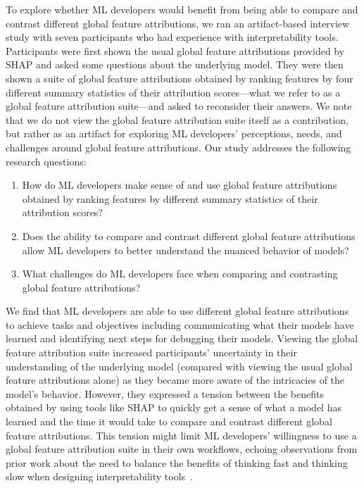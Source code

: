 \documentclass[11pt,dvipdfmx]{article}
\begin{document}
To explore whether ML developers would benefit from being able to
compare and contrast different global feature attributions, we ran an
artifact-based interview study with seven participants who had
experience with interpretability tools.  Participants were first shown
the usual global feature attributions provided by SHAP and asked some
questions about the underlying model.  They were then shown a suite of
global feature attributions obtained by ranking features by four
different summary statistics of their attribution scores---what we
refer to as a global feature attribution suite---and asked to
reconsider their answers.  We note that we do not view the global
feature attribution suite itself as a contribution, but rather as an
artifact for exploring ML developers' perceptions, needs, and
challenges around global feature attributions. Our study addresses the
following research questions:
\begin{enumerate}
  \setlength\itemsep{0pt} \setlength\parskip{0pt} \item How do ML
  developers make sense of and use global feature attributions
  obtained by ranking features by different summary statistics of
  their attribution scores?
\item Does the ability to compare and contrast different global
  feature attributions allow ML developers to better understand the
  nuanced behavior of models?
\item What challenges do ML developers face when comparing and
  contrasting global feature attributions?
\end{enumerate}

We find that ML developers are able to use different global
feature attributions to achieve tasks and objectives including
communicating what their models have learned and identifying next
steps for debugging their models. Viewing the global feature
attribution suite increased participants' uncertainty in their
understanding of the underlying model (compared with viewing the usual
global feature attributions alone) as they became more aware of the
intricacies of the model's behavior. However, they expressed a tension
between the benefits obtained by using tools like SHAP to quickly get
a sense of what a model has learned and the time it would take to
compare and contrast different global feature attributions. This
tension might limit ML developers' willingness to use a global feature
attribution suite in their own workflows, echoing observations from
prior work about the need to balance the benefits of thinking fast and
thinking slow when designing interpretability
tools~\citep{InterpretingInterpretability}.
\end{document}
